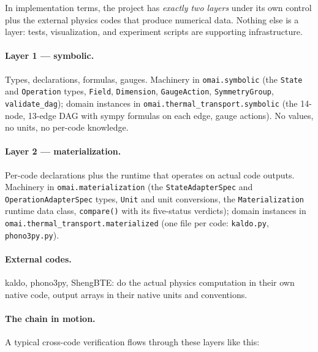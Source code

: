 \documentclass[11pt,a4paper]{article}
\begin{document}
In implementation terms, the project has \emph{exactly two layers} under its
own control plus the external physics codes that produce numerical data.
Nothing else is a layer: tests, visualization, and experiment scripts are
supporting infrastructure.

\paragraph{Layer 1 --- symbolic.} Types, declarations, formulas, gauges.
Machinery in \texttt{omai.symbolic} (the \texttt{State} and
\texttt{Operation} types, \texttt{Field}, \texttt{Dimension},
\texttt{GaugeAction}, \texttt{SymmetryGroup}, \texttt{validate\_dag});
domain instances in \texttt{omai.thermal\_transport.symbolic} (the
14-node, 13-edge DAG with sympy formulas on each edge, gauge actions).
No values, no units, no per-code knowledge.

\paragraph{Layer 2 --- materialization.} Per-code declarations plus the
runtime that operates on actual code outputs. Machinery in
\texttt{omai.materialization} (the \texttt{StateAdapterSpec} and
\texttt{OperationAdapterSpec} types, \texttt{Unit} and unit conversions,
the \texttt{Materialization} runtime data class, \texttt{compare()} with
its five-status verdicts); domain instances in
\texttt{omai.thermal\_transport.materialized} (one file per code:
\texttt{kaldo.py}, \texttt{phono3py.py}).

\paragraph{External codes.} kaldo, phono3py, ShengBTE: do the actual
physics computation in their own native code, output arrays in their
native units and conventions.

\paragraph{The chain in motion.} A typical cross-code verification flows
through these layers like this:
\end{document}
